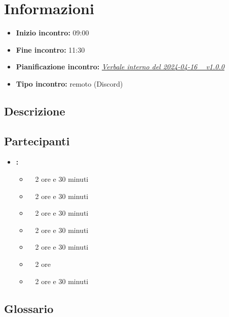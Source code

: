 \section{Informazioni}
\begin{itemize}
	\item \textbf{Inizio incontro:} 09:00
	\item \textbf{Fine incontro:} 11:30
	\item \textbf{Pianificazione incontro:} \href{https://argo-swe.github.io/2_RTB/Verbali/Interni/VerbaleInterno_2024-04-16.pdf}{\emph{Verbale interno del 2024-04-16 \  v1.0.0}}
	\item \textbf{Tipo incontro:} remoto (Discord)
\end{itemize}

\subsection{Descrizione}
\DocDescription

\subsection{Partecipanti}

\begin{itemize}
	\item \textbf{\GroupName:}
	\begin{itemize}
		\item \tommaso \ \rightarrow\ 2 ore e 30 minuti
		\item \marco \ \rightarrow\ 2 ore e 30 minuti
		\item \riccardo \ \rightarrow\ 2 ore e 30 minuti
		\item \raul \ \rightarrow\ 2 ore e 30 minuti
		\item \martina \ \rightarrow\ 2 ore e 30 minuti
		\item \sebastiano \ \rightarrow\ 2 ore
		\item \mattia \ \rightarrow\ 2 ore e 30 minuti
	\end{itemize}
\end{itemize}

\subsection{Glossario}
\GlossarioIntroduzione

\clearpage